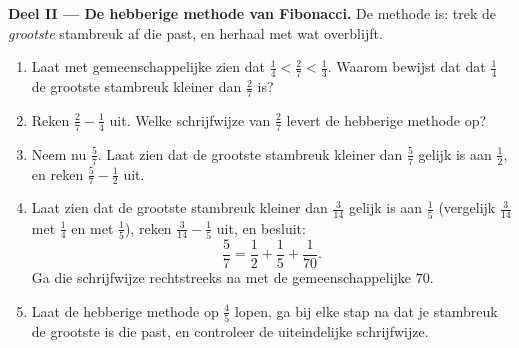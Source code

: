 \begin{problem}
\medskip
\noindent\textbf{Deel II --- De hebberige methode van Fibonacci.}
De methode is: trek de \emph{grootste} stambreuk af die past, en herhaal met wat
overblijft.
\begin{enumerate}[resume]
  \item Laat met gemeenschappelijke  zien dat $\frac14 < \frac27 < \frac13$.
        Waarom bewijst dat dat $\frac14$ de grootste stambreuk kleiner dan $\frac27$
        is?
  \item Reken $\frac27 - \frac14$ uit. Welke schrijfwijze van $\frac27$ levert de
        hebberige methode op?
  \item Neem nu $\frac57$. Laat zien dat de grootste stambreuk kleiner dan $\frac57$
        gelijk is aan $\frac12$, en reken $\frac57 - \frac12$ uit.
  \item Laat zien dat de grootste stambreuk kleiner dan $\frac{3}{14}$ gelijk is aan
        $\frac15$ (vergelijk $\frac{3}{14}$ met $\frac14$ en met $\frac15$), reken
        $\frac{3}{14} - \frac15$ uit, en besluit:
        \[
        \frac57 = \frac12 + \frac15 + \frac{1}{70} .
        \]
        Ga die schrijfwijze rechtstreeks na met de gemeenschappelijke  $70$.
  \item Laat de hebberige methode op $\frac45$ lopen, ga bij elke stap na dat je
        stambreuk de grootste is die past, en controleer de uiteindelijke schrijfwijze.
\end{enumerate}


\end{problem}
